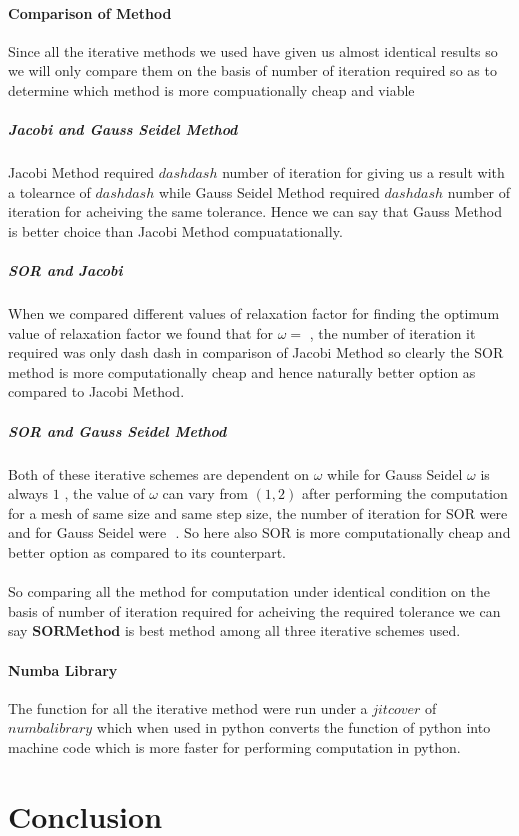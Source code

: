 \paragraph{Comparison of Method}
Since all the iterative methods we used have given us almost identical results so we will only compare them on the basis of number of iteration required so as to determine which method is more compuationally cheap and viable
\subparagraph{Jacobi and Gauss Seidel Method}Jacobi Method required $dash dash $ number of iteration for giving us a result with a tolearnce of $ dash dash $ while Gauss Seidel Method required $ dash dash $ number of iteration for acheiving the same tolerance. Hence we can say that Gauss Method is better choice than Jacobi Method compuatationally.  
\subparagraph{SOR and Jacobi}When we compared different values of relaxation factor for finding the optimum value of relaxation factor we found that for $ \omega = $ , the number of iteration it required was only dash dash in comparison of Jacobi Method so clearly the SOR method is more computationally cheap and hence naturally better option as compared to Jacobi Method.
\subparagraph{SOR and Gauss Seidel Method} Both of these iterative schemes are dependent on $\omega$ while for Gauss Seidel $ \omega$ is always $1$ , the value of $\omega$ can vary from $(1,2)$ after performing the computation for a mesh of same size and same step size, the number of iteration for SOR were $  $ and for Gauss Seidel were $  $ . So here also SOR is more computationally cheap and better option as compared to its counterpart.\\
\\
So comparing all the method for computation under identical condition on the basis of number of iteration required for acheiving the required tolerance we can say $ \boldsymbol{SOR Method} $ is best method among all three iterative schemes used.

\paragraph{Numba Library} The function for all the iterative method were run under a $ jit cover $ of $ numba library$ which when used in python converts the function of python into machine code which is more faster for performing computation in python.

\newpage
\section{Conclusion}
